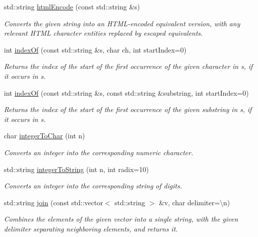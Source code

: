 \begin{DoxyCompactItemize}
std\+::string \mbox{\hyperlink{namespacesgl_1_1priv_1_1strlib_a21319276d7e93ef843ec933eba1d30ba}{html\+Encode}} (const std\+::string \&s)
\begin{DoxyCompactList}\small\item\em Converts the given string into an H\+T\+M\+L-\/encoded equivalent version, with any relevant H\+T\+ML character entities replaced by escaped equivalents. \end{DoxyCompactList}\item 
int \mbox{\hyperlink{namespacesgl_1_1priv_1_1strlib_ac00729dfe0ba994523cf8591a16c1f8e}{index\+Of}} (const std\+::string \&s, char ch, int start\+Index=0)
\begin{DoxyCompactList}\small\item\em Returns the index of the start of the first occurrence of the given character in s, if it occurs in s. \end{DoxyCompactList}\item 
int \mbox{\hyperlink{namespacesgl_1_1priv_1_1strlib_afb99d6e0fd373a67f029ad67cf9c46db}{index\+Of}} (const std\+::string \&s, const std\+::string \&substring, int start\+Index=0)
\begin{DoxyCompactList}\small\item\em Returns the index of the start of the first occurrence of the given substring in s, if it occurs in s. \end{DoxyCompactList}\item 
char \mbox{\hyperlink{namespacesgl_1_1priv_1_1strlib_adf319817276df06d9df8124ebdb354b1}{integer\+To\+Char}} (int n)
\begin{DoxyCompactList}\small\item\em Converts an integer into the corresponding numeric character. \end{DoxyCompactList}\item 
std\+::string \mbox{\hyperlink{namespacesgl_1_1priv_1_1strlib_a495a9775bf29121e1781cc2627f84484}{integer\+To\+String}} (int n, int radix=10)
\begin{DoxyCompactList}\small\item\em Converts an integer into the corresponding string of digits. \end{DoxyCompactList}\item 
std\+::string \mbox{\hyperlink{namespacesgl_1_1priv_1_1strlib_ae167c589e7dec5af5a4521f264017fd4}{join}} (const std\+::vector$<$ std\+::string $>$ \&v, char delimiter=\textquotesingle{}\textbackslash{}n\textquotesingle{})
\begin{DoxyCompactList}\small\item\em Combines the elements of the given vector into a single string, with the given delimiter separating neighboring elements, and returns it. \end{DoxyCompactList}\item 

\end{DoxyCompactItemize}
